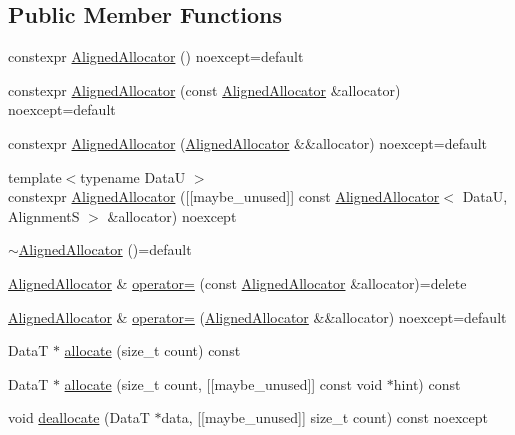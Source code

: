 \subsection*{Public Member Functions}
\begin{DoxyCompactItemize}
\item 
constexpr \hyperlink{classmage_1_1_aligned_allocator_a882b621a8276d046f3300385680442cf}{Aligned\+Allocator} () noexcept=default
\item 
constexpr \hyperlink{classmage_1_1_aligned_allocator_ad5ccaa890d899f8876253a5bfd83a1ba}{Aligned\+Allocator} (const \hyperlink{classmage_1_1_aligned_allocator}{Aligned\+Allocator} \&allocator) noexcept=default
\item 
constexpr \hyperlink{classmage_1_1_aligned_allocator_a5913d9165132c04473673dd0214e8817}{Aligned\+Allocator} (\hyperlink{classmage_1_1_aligned_allocator}{Aligned\+Allocator} \&\&allocator) noexcept=default
\item 
{\footnotesize template$<$typename DataU $>$ }\\constexpr \hyperlink{classmage_1_1_aligned_allocator_a04afd26f90cd17cbfc5134a375e273a9}{Aligned\+Allocator} (\mbox{[}\mbox{[}maybe\+\_\+unused\mbox{]}\mbox{]} const \hyperlink{classmage_1_1_aligned_allocator}{Aligned\+Allocator}$<$ DataU, AlignmentS $>$ \&allocator) noexcept
\item 
\hyperlink{classmage_1_1_aligned_allocator_a98bda5c375a177eaa71cd622622451eb}{$\sim$\+Aligned\+Allocator} ()=default
\item 
\hyperlink{classmage_1_1_aligned_allocator}{Aligned\+Allocator} \& \hyperlink{classmage_1_1_aligned_allocator_abff2de92167b6f602cdd9cbbffa316fe}{operator=} (const \hyperlink{classmage_1_1_aligned_allocator}{Aligned\+Allocator} \&allocator)=delete
\item 
\hyperlink{classmage_1_1_aligned_allocator}{Aligned\+Allocator} \& \hyperlink{classmage_1_1_aligned_allocator_a2b4f00334e5c546b18285ddb02e44bd1}{operator=} (\hyperlink{classmage_1_1_aligned_allocator}{Aligned\+Allocator} \&\&allocator) noexcept=default
\item 
DataT $\ast$ \hyperlink{classmage_1_1_aligned_allocator_aa40b7eb431ac79e6b09bbd9e55906e78}{allocate} (size\+\_\+t count) const
\item 
DataT $\ast$ \hyperlink{classmage_1_1_aligned_allocator_aff8039dfa7eae184e527bf13b2fac431}{allocate} (size\+\_\+t count, \mbox{[}\mbox{[}maybe\+\_\+unused\mbox{]}\mbox{]} const void $\ast$hint) const
\item 
void \hyperlink{classmage_1_1_aligned_allocator_a4e8a8d0af97cbeba864182a78d20d079}{deallocate} (DataT $\ast$data, \mbox{[}\mbox{[}maybe\+\_\+unused\mbox{]}\mbox{]} size\+\_\+t count) const noexcept

\end{DoxyCompactItemize}
